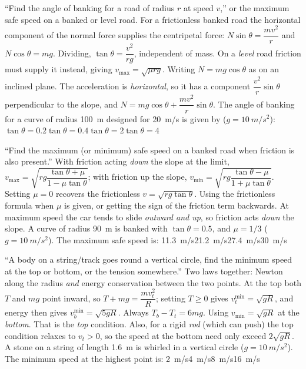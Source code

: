 {``Find the angle of banking for a road of radius $r$ at speed $v$,'' or the maximum safe speed on a
banked or level road.}
{For a frictionless banked road the horizontal component of the normal force supplies the centripetal
force: $N\sin\theta=\dfrac{mv^2}{r}$ and $N\cos\theta=mg$. Dividing,
$\boxed{\tan\theta=\dfrac{v^2}{rg}}$, independent of mass. On a \emph{level} road friction must supply it
instead, giving $v_{\max}=\sqrt{\mu rg}$.}
{Writing $N=mg\cos\theta$ as on an inclined plane. The acceleration is \emph{horizontal}, so it has a
component $\dfrac{v^2}{r}\sin\theta$ perpendicular to the slope, and
$N=mg\cos\theta+\dfrac{mv^2}{r}\sin\theta$.}
{The angle of banking for a curve of radius \SI{100}{m} designed for \SI{20}{m/s} is given by
($g=\SI{10}{m/s^2}$):}
{$\tan\theta=0.2$}{$\tan\theta=0.4$}{$\tan\theta=2$}{$\tan\theta=4$}

{``Find the maximum (or minimum) safe speed on a banked road when friction is also present.''}
{With friction acting \emph{down} the slope at the limit,
$v_{\max}=\sqrt{rg\dfrac{\tan\theta+\mu}{1-\mu\tan\theta}}$; with friction up the slope,
$v_{\min}=\sqrt{rg\dfrac{\tan\theta-\mu}{1+\mu\tan\theta}}$. Setting $\mu=0$ recovers the frictionless
$v=\sqrt{rg\tan\theta}$.}
{Using the frictionless formula when $\mu$ is given, or getting the sign of the friction term
backwards. At maximum speed the car tends to slide \emph{outward and up}, so friction acts \emph{down}
the slope.}
{A curve of radius \SI{90}{m} is banked with $\tan\theta=0.5$, and $\mu=1/3$ ($g=\SI{10}{m/s^2}$). The
maximum safe speed is:}
{\SI{11.3}{m/s}}{\SI{21.2}{m/s}}{\SI{27.4}{m/s}}{\SI{30}{m/s}}

{``A body on a string/track goes round a vertical circle, find the minimum speed at the top or
bottom, or the tension somewhere.''}
{Two laws together: Newton along the radius \emph{and} energy conservation between the two points. At
the top both $T$ and $mg$ point inward, so $T+mg=\dfrac{mv_t^2}{R}$; setting $T\ge0$ gives
$v_t^{\min}=\sqrt{gR}$, and energy then gives $v_b^{\min}=\sqrt{5gR}$. Always
$T_b-T_t=6mg$.}
{Using $v_{\min}=\sqrt{gR}$ at the \emph{bottom}. That is the \emph{top} condition. Also, for a rigid
\emph{rod} (which can push) the top condition relaxes to $v_t>0$, so the speed at the bottom need only
exceed $2\sqrt{gR}$.}
{A stone on a string of length \SI{1.6}{m} is whirled in a vertical circle ($g=\SI{10}{m/s^2}$). The minimum speed at
the highest point is:}
{\SI{2}{m/s}}{\SI{4}{m/s}}{\SI{8}{m/s}}{\SI{16}{m/s}}

